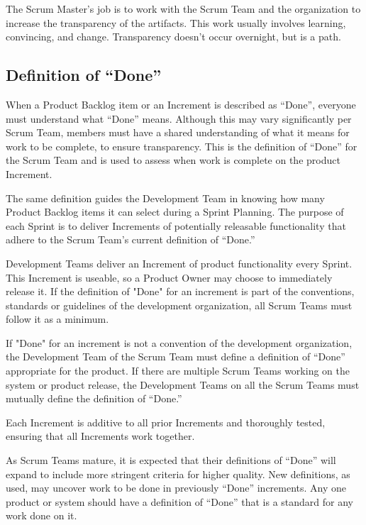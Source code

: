 The Scrum Master's job is to work with the Scrum Team and the organization to increase the
transparency of the artifacts. This work usually involves learning, convincing, and change.
Transparency doesn't occur overnight, but is a path.

\subsection{Definition of ``Done''}
When a Product Backlog item or an Increment is described as ``Done'', everyone must
understand what ``Done'' means. Although this may vary significantly per Scrum Team, members
must have a shared understanding of what it means for work to be complete, to ensure
transparency. This is the definition of ``Done'' for the Scrum Team and is used to assess when
work is complete on the product Increment.

The same definition guides the Development Team in knowing how many Product Backlog items
it can select during a Sprint Planning. The purpose of each Sprint is to deliver Increments of
potentially releasable functionality that adhere to the Scrum Team's current definition of
``Done.''

Development Teams deliver an Increment of product functionality every Sprint. This Increment
is useable, so a Product Owner may choose to immediately release it. If the definition of "Done"
for an increment is part of the conventions, standards or guidelines of the development
organization, all Scrum Teams must follow it as a minimum.

If "Done" for an increment is not a convention of the development organization, the
Development Team of the Scrum Team must define a definition of ``Done'' appropriate for the
product. If there are multiple Scrum Teams working on the system or product release, the
Development Teams on all the Scrum Teams must mutually define the definition of ``Done.''

Each Increment is additive to all prior Increments and thoroughly tested, ensuring that all
Increments work together.

As Scrum Teams mature, it is expected that their definitions of ``Done'' will expand to include
more stringent criteria for higher quality. New definitions, as used, may uncover work to be
done in previously ``Done'' increments. Any one product or system should have a definition of
``Done'' that is a standard for any work done on it.

